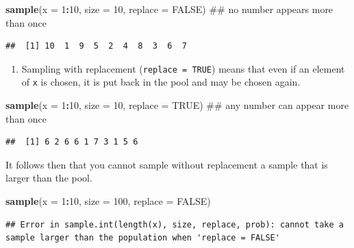 \documentclass[]{book}
\newenvironment{Shaded}{\begin{snugshade}}{\end{snugshade}}
\newcommand{\KeywordTok}[1]{\textcolor[rgb]{0.13,0.29,0.53}{\textbf{#1}}}
\newcommand{\DataTypeTok}[1]{\textcolor[rgb]{0.13,0.29,0.53}{#1}}
\newcommand{\DecValTok}[1]{\textcolor[rgb]{0.00,0.00,0.81}{#1}}
\newcommand{\OtherTok}[1]{\textcolor[rgb]{0.56,0.35,0.01}{#1}}
\newcommand{\OperatorTok}[1]{\textcolor[rgb]{0.81,0.36,0.00}{\textbf{#1}}}
\newcommand{\NormalTok}[1]{#1}
\providecommand{\tightlist}{%
  \setlength{\itemsep}{0pt}\setlength{\parskip}{0pt}}
\theoremstyle{definition}
\theoremstyle{definition}
\theoremstyle{definition}
\theoremstyle{remark}
\begin{document}
\begin{Shaded}
\begin{Highlighting}[]
\KeywordTok{sample}\NormalTok{(}\DataTypeTok{x =} \DecValTok{1}\OperatorTok{:}\DecValTok{10}\NormalTok{, }\DataTypeTok{size =} \DecValTok{10}\NormalTok{, }\DataTypeTok{replace =} \OtherTok{FALSE}\NormalTok{) ## no number appears more than once}
\end{Highlighting}
\end{Shaded}

\begin{verbatim}
##  [1] 10  1  9  5  2  4  8  3  6  7
\end{verbatim}

\begin{enumerate}
\def\labelenumi{\arabic{enumi}.}
\setcounter{enumi}{1}
\tightlist
\item
  Sampling with replacement (\texttt{replace\ =\ TRUE}) means that even
  if an element of \texttt{x} is chosen, it is put back in the pool and
  may be chosen again.
\end{enumerate}

\begin{Shaded}
\begin{Highlighting}[]
\KeywordTok{sample}\NormalTok{(}\DataTypeTok{x =} \DecValTok{1}\OperatorTok{:}\DecValTok{10}\NormalTok{, }\DataTypeTok{size =} \DecValTok{10}\NormalTok{, }\DataTypeTok{replace =} \OtherTok{TRUE}\NormalTok{) ## any number can appear more than once}
\end{Highlighting}
\end{Shaded}

\begin{verbatim}
##  [1] 6 2 6 6 1 7 3 1 5 6
\end{verbatim}

It follows then that you cannot sample without replacement a sample that
is larger than the pool.

\begin{Shaded}
\begin{Highlighting}[]
\KeywordTok{sample}\NormalTok{(}\DataTypeTok{x =} \DecValTok{1}\OperatorTok{:}\DecValTok{10}\NormalTok{, }\DataTypeTok{size =} \DecValTok{100}\NormalTok{, }\DataTypeTok{replace =} \OtherTok{FALSE}\NormalTok{)}
\end{Highlighting}
\end{Shaded}

\begin{verbatim}
## Error in sample.int(length(x), size, replace, prob): cannot take a sample larger than the population when 'replace = FALSE'
\end{verbatim}
\end{document}
